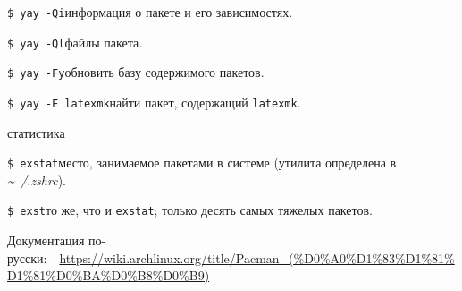 \documentclass[
a4paper
,11pt
,landscape
,russian
,twocolumn
]{letter}
\newcommand\hsp{\hspace{.2in}}
\newcommand\vsp{\vspace{.2in}}
\begin{document}
\vsp

\texttt{\$ yay -Qi}\hsp информация о пакете и его зависимостях.

\texttt{\$ yay -Ql}\hsp файлы пакета.

\texttt{\$ yay -Fy}\hsp обновить базу содержимого пакетов.

\texttt{\$ yay -F latexmk}\hsp найти пакет, содержащий \texttt{latexmk}.

\vsp

\begin{Large}
статистика
\end{Large}

\vsp

\texttt{\$ exstat}\hsp место, занимаемое пакетами в системе
(утилита определена в \textit{\~~/.zshrc}).

\texttt{\$ exst}\hsp то же, что и \texttt{exstat}; только десять
самых тяжелых пакетов.

\vsp

Документация
\newline
по-русски:~~\url{https://wiki.archlinux.org/title/Pacman_(%D0%A0%D1%83%D1%81%D1%81%D0%BA%D0%B8%D0%B9)}
\end{document}
